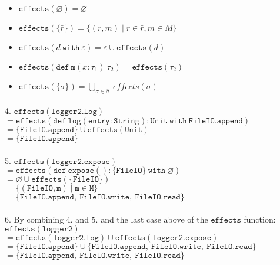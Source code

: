 \documentclass{llncs}
\newcommand{\keywadj}[1]{\mathtt{#1}}
\newcommand{\keyw}[1]{\keywadj{#1}~}
\begin{document}
\begin{itemize}
	\item $\keywadj{effects}(\varnothing) = \varnothing$
		\item $\keywadj{effects}(\{\bar r\}) = \{ (r, m) \mid r \in \bar r, m \in M \}$
	\item $\keywadj{effects}(d~\keyw{with} \varepsilon) = \varepsilon \cup \keywadj{effects}(d)$
	\item $\keywadj{effects}(\keywadj{def~m}(x : \tau_1)~\tau_2) = \keywadj{effects}(\tau_2)$
	\item $\keywadj{effects}(\{\bar \sigma\}) = \bigcup_{\sigma \in \bar \sigma}~effects(\sigma)$
\end{itemize}

\paragraph{}
4. $\keywadj{effects(logger2.log)}$\\
$\keywadj{= effects(def~log (entry : String) : Unit~with~FileIO.append)}$\\
$\keywadj{= \{ FileIO.append \} \cup effects(Unit)}$\\
$\keywadj{= \{ FileIO.append \}}$

\paragraph{}
5. $\keywadj{effects(logger2.expose)}$\\
$\keywadj{= effects(def~expose () : \{ FileIO \}~with~\varnothing)}$\\
$\keywadj{= \varnothing \cup effects(\{ FileIO \})}$\\
$\keywadj{ = \{ (FileIO, m) \mid m \in M \}}$\\
$\keywadj{= \{ FileIO.append,~FileIO.write,~ FileIO.read \}}$

\paragraph{}
6. By combining 4. and 5. and the last case above of the $\keywadj{effects}$ function:
$\keywadj{effects(logger2)}$\\
$\keywadj{= effects(logger2.log) \cup effects(logger2.expose)}$\\
$\keywadj{= \{ FileIO.append \} \cup \{ FileIO.append,~FileIO.write,~ FileIO.read \}}$\\
$\keywadj{= \{ FileIO.append,~FileIO.write,~ FileIO.read \}}$
\end{document}
